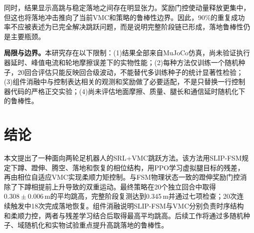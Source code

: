 \documentclass[12pt,a4paper,fontset=fandol]{ctexart}
\numberwithin{equation}{section}
\numberwithin{figure}{section}
\numberwithin{table}{section}
\begin{document}
同时，结果显示高跳与稳定落地之间存在明显张力。奖励门控使动量释放更集中，但这也将落地冲击推向了当前VMC和策略的鲁棒性边界。因此，90\%的重复成功率不应被表述为已完全解决跳跃问题，而是说明完整阶段链已形成，落地鲁棒性仍是主要瓶颈。

\textbf{局限与边界。}本研究存在以下限制：(1)结果全部来自MuJoCo仿真，尚未验证执行器延时、峰值电流和轮地摩擦误差下的实物性能；(2)每种方法仅训练一个随机种子，20回合评估只能反映回合级波动，不能替代多训练种子的统计显著性检验；(3)组件消融中与控制表达相关的观测和奖励做了必要适配，不是只替换一行控制器代码的严格正交实验；(4)尚未评估地面摩擦、质量、腿长和通信延时随机化下的鲁棒性。

\section{结论}

本文提出了一种面向两轮足机器人的SRL+VMC跳跃方法。该方法用SLIP-FSM规定下蹲、蹬伸、腾空、落地和恢复的相位结构，用PPO学习虚拟腿目标的残差，再由相位自适应VMC实现柔顺力矩控制。与FSM物理状态一致的蹬伸奖励门控消除了下蹲相提前上升导致的双重运动。最终策略在20个独立回合中取得$0.308\pm0.006$\,m的平均跳高，完整阶段复测达到0.345\,m并通过七项检查；20次连续触发中18次完成落地恢复。组件消融说明SLIP-FSM与VMC分别负责时序结构和柔顺力控，两者与残差学习结合后取得最高平均跳高。后续工作将通过多随机种子、域随机化和实物试验重点提升高跳落地的鲁棒性。

\printbibliography[title={参考文献}]
\end{document}
